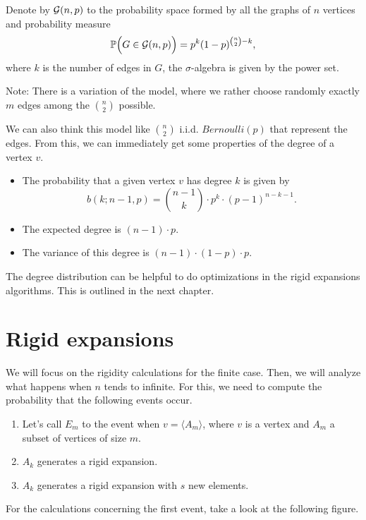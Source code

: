 \begin{defini}
Denote by $\mathcal{G}(n,p)$ to the probability space formed by all the graphs of $n$ vertices and probability measure 
$$ \mathbb{P}\Big(G\in \mathcal{G}(n,p)\Big) = p^{k} (1-p)^{\binom{n}{2}-k},$$
where $k$ is the number of edges in $G$, the $\sigma$-algebra is given by the power set.
\end{defini}

Note: There is a variation of the model, where we rather choose randomly exactly $m$ edges among the $\binom{n}{2}$ possible.

We can also think this model like $\binom{n}{2}$ i.i.d. $Bernoulli(p)$ that represent the edges. From this, we can immediately get some properties of the degree of a vertex $v$.

\begin{itemize}
\item The probability that a given vertex $v$ has degree $k$ is given by
$$b(k; n-1,p) = \binom{n-1}{k} \cdot p^{k} \cdot (p-1)^{n-k-1}.$$
\item The expected degree is $(n-1)\cdot p$.
\item The variance of this degree is $(n-1)\cdot (1-p) \cdot p$.
\end{itemize}

The degree distribution can be helpful to do optimizations in the rigid expansions algorithms. This is outlined in the next chapter.

\section{Rigid expansions}

 We will focus on the rigidity calculations for the finite case. Then, we will analyze what happens when $n$ tends to infinite. For this, we need to compute the probability that the following events occur.

\begin{enumerate}
\item Let's call $E_{m}$ to the event when $v=\langle A_{m}\rangle$, where $v$ is a vertex and $A_{m}$ a subset of vertices of size $m$.
\item $A_k$ generates a rigid expansion.
\item $A_k$ generates a rigid expansion with $s$ new elements.
\end{enumerate}

For the calculations concerning the first event, take a look at the following figure.

